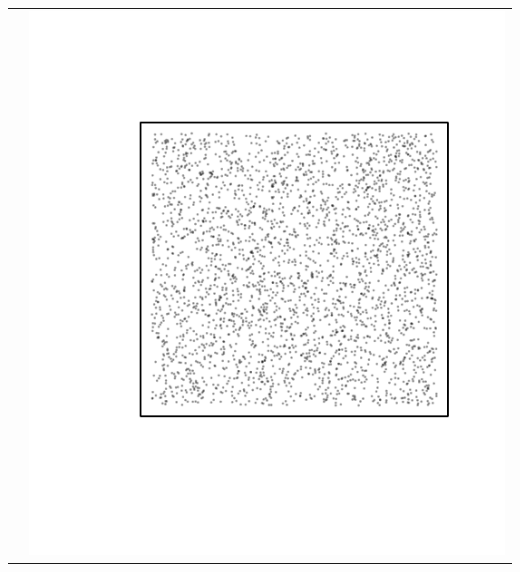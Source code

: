 \documentclass{article}\usepackage{graphicx, color}
\makeatletter
\def\maxwidth{ %
  \ifdim\Gin@nat@width>\linewidth
    \linewidth
  \else
    \Gin@nat@width
  \fi
}
\newenvironment{knitrout}{}{} %
\makeatother
\begin{document}
\begin{tabular}{cc}
&
\begin{knitrout}
\definecolor{shadecolor}{rgb}{0.969, 0.969, 0.969}\color{fgcolor}\includegraphics[width=\maxwidth]{figure/unnamed-chunk-10} 
\end{knitrout}

\\
\end{tabular}
\end{document}
